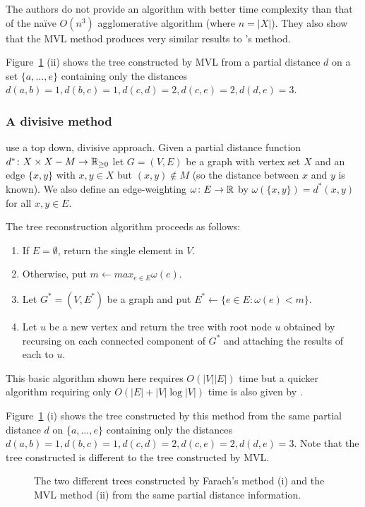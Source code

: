 The authors do not provide an algorithm with better time complexity than that
of the naïve $O(n^3)$ agglomerative algorithm (where $n = |X|$).  They also
show that the MVL method produces very similar results to
\citeauthor{de1984ultrametric}'s method.

Figure~\ref{fig:farach-mvl-ex} (ii) shows the tree constructed by MVL from a
partial distance $d$ on a set $\{a,\dotsc,e\}$ containing only the distances
$d(a,b)=1, d(b,c)=1, d(c,d)=2, d(c,e)=2, d(d,e)=3$.

\subsubsection{A divisive method}
\label{sec:part-dist-divisive-method}

\cite{farach1995robust} use a top down, divisive approach.  Given a partial
distance function $d^* \colon X \times X - M \to {\mathbb R}_{\geq 0}$ let $G=(V,E)$ be a
graph with vertex set $X$ and an edge $\{x,y\}$ with $x,y \in X$ but $(x,y)
\notin M$ (so the distance between $x$ and $y$ is known).  We also define an
edge-weighting $\omega \colon E \to {\mathbb R}$ by $\omega(\{x,y\}) = d^*(x,y)$ for
all $x,y \in E$.

The tree reconstruction algorithm proceeds as follows:
\begin{enumerate}
\item If $E = \emptyset$, return the single element in $V$.
\item Otherwise, put $m \gets max_{e \in E} \omega(e)$.
\item Let $G^* = (V,E^*)$ be a graph and put $E^* \gets \{e \in E \colon
  \omega(e) < m\}$.
\item Let $u$ be a new vertex and return the tree with root node $u$ obtained
  by recursing on each connected component of $G^*$ and attaching the results
  of each to $u$.               %
\end{enumerate}
This basic algorithm shown here requires $O(|V||E|)$ time but a quicker
algorithm requiring only $O(|E| + |V|\log |V|)$ time is also given by
\cite{farach1995robust}.

Figure~\ref{fig:farach-mvl-ex} (i) shows the tree constructed by this method
from the same partial distance $d$ on $\{a,\dotsc,e\}$ containing only the
distances $d(a,b)=1, d(b,c)=1, d(c,d)=2, d(c,e)=2, d(d,e)=3$.  Note that the
tree constructed is different to the tree constructed by MVL.

\begin{figure}
  \centering
  
  \caption{The two different trees constructed by Farach's method (i) and the
    MVL method (ii) from the same partial distance information.}
  \label{fig:farach-mvl-ex}
\end{figure}

